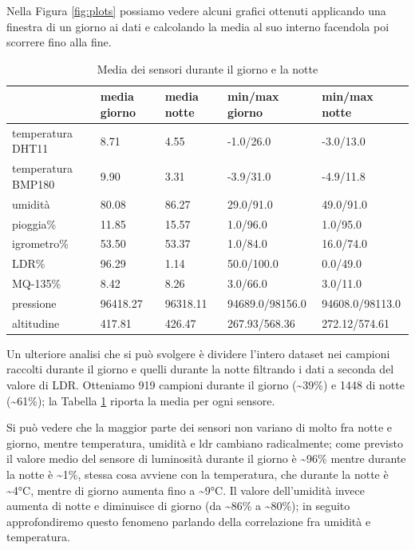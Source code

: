 \documentclass[a4paper, 12pt]{report}
\begin{document}
Nella Figura \ref{fig:plots} possiamo vedere alcuni grafici ottenuti applicando una finestra di un giorno ai dati e calcolando la media al suo interno facendola poi scorrere fino alla fine.

\begin{table}
  \centering
  \begin{tabular}{ l l l l l }
  \hline
   & media giorno & media notte & min/max giorno & min/max notte \\
  \hline
  temperatura DHT11 & 8.71 & 4.55 & -1.0/26.0 & -3.0/13.0 \\
  temperatura BMP180 & 9.90 & 3.31 & -3.9/31.0 & -4.9/11.8 \\
  umidità & 80.08 & 86.27 & 29.0/91.0 & 49.0/91.0 \\
  pioggia\% & 11.85 & 15.57 & 1.0/96.0 & 1.0/95.0 \\
  igrometro\% & 53.50 & 53.37 & 1.0/84.0 & 16.0/74.0 \\
  LDR\% & 96.29 & 1.14 & 50.0/100.0 & 0.0/49.0 \\
  MQ-135\% & 8.42 & 8.26 & 3.0/66.0 & 3.0/11.0 \\
  pressione & 96418.27 & 96318.11 & 94689.0/98156.0 & 94608.0/98113.0 \\
  altitudine & 417.81 & 426.47 & 267.93/568.36 & 272.12/574.61 \\
  \hline
  \end{tabular}
  \caption{Media dei sensori durante il giorno e la notte}
  \label{tab:daynight}
\end{table}

Un ulteriore analisi che si può svolgere è dividere l'intero dataset nei campioni raccolti durante il giorno e quelli durante la notte filtrando i dati a seconda del valore di LDR. 
Otteniamo 919 campioni durante il giorno (\textasciitilde39\%) e 1448 di notte (\textasciitilde61\%); la Tabella \ref{tab:daynight} riporta la media per ogni sensore.

Si può vedere che la maggior parte dei sensori non variano di molto fra notte e giorno, mentre temperatura, umidità e ldr cambiano radicalmente; come previsto il valore medio 
del sensore di luminosità durante il giorno è \textasciitilde96\% mentre durante la notte è \textasciitilde1\%, stessa cosa avviene con la temperatura, che durante la notte è \textasciitilde4°C, mentre di 
giorno aumenta fino a \textasciitilde9°C. Il valore dell'umidità invece aumenta di notte e diminuisce di giorno (da \textasciitilde86\% a \textasciitilde80\%); in seguito approfondiremo questo fenomeno parlando 
della correlazione fra umidità e temperatura.
\end{document}
